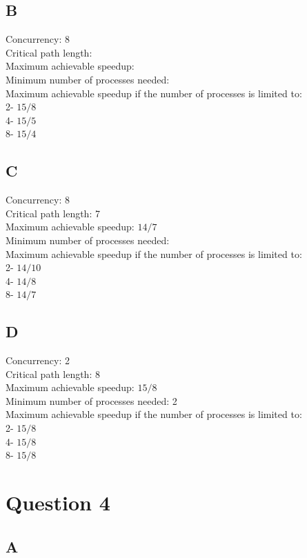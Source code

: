 \documentclass[12pt]{article}
\begin{document}
    \subsection*{B}
    Concurrency: 8\\
    Critical path length: \\
    Maximum achievable speedup: \\
    Minimum number of processes needed: \\
    Maximum achievable speedup if the number of processes is limited to: \\
        2- \(15/8\)\\
        4- \(15/5\)\\ 
        8- \(15/4\)\\
    \subsection*{C}
    Concurrency: 8\\
    Critical path length: 7\\
    Maximum achievable speedup: \(14/7\)\\
    Minimum number of processes needed: \\
    Maximum achievable speedup if the number of processes is limited to: \\
        2- \(14/10\)\\
        4- \(14/8\)\\ 
        8- \(14/7\)\\
    \subsection*{D}
    Concurrency: 2\\
    Critical path length: 8\\
    Maximum achievable speedup: \(15/8\)\\
    Minimum number of processes needed: 2\\
    Maximum achievable speedup if the number of processes is limited to: \\
        2- \(15/8\)\\
        4- \(15/8\)\\ 
        8- \(15/8\)\\
    \section{Question 4}
    \subsection*{A}
\end{document}
